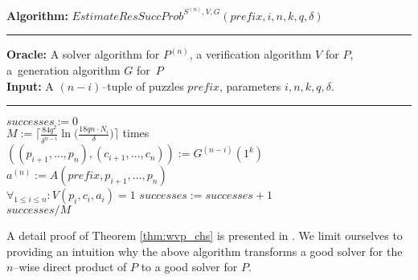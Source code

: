 %
\begin{codeblock}
  \textbf{Algorithm:} $\mathit{EstimateResSuccProb}^{S^{(n)},V, G}(\mathit{prefix}, i, n, k, q, \delta)$
  \medskip \hrule
  \textbf{Oracle:} A solver algorithm for $P^{(n)}$, a verification algorithm $V$ for $P$, a~generation algorithm $G$ for~$P$\\
  \textbf{Input:} A $(n-i)$--tuple of puzzles $\mathit{prefix}$, parameters $i, n, k, q, \delta$.
  \medskip\hrule
  $successes := 0$ \\
  \Repeat $M := \Big\lceil \frac{84q^2}{\delta^{n-i}} \ln \Big(\frac{18qn \cdot N_i}{\delta} \Big) \Big\rceil$ times \\
  \IndI $((p_{i+1}, \dotsc, p_n), (c_{i+1}, \dotsc, c_n)) := G^{(n-i)}(1^k)$\\
  \IndI $a^{(n)} := A(\mathit{prefix}, p_{i+1}, \dotsc, p_{n})$\\
  \IndI \If $\forall_{1 \leq i \leq n} : V(p_i, c_i, a_i) = 1$ \Then $\mathit{successes := successes + 1}$ \\
  \Return $successes / M$
\end{codeblock}
%
A detail proof of Theorem \ref{thm:wvp_chs} is presented in \cite{canetti2004hardness}.
We limit ourselves to providing an intuition why the above algorithm transforms a good solver
for the $n$--wise direct product of $P$ to a good solver for $P$.

